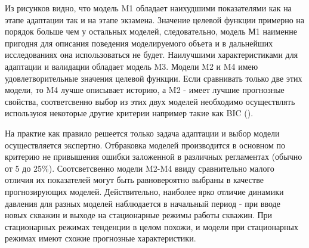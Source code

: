\documentclass{article}
\begin{document}
Из рисунков видно, что модель M1 обладает наихудшими показателями как на этапе адаптации так и на этапе экзамена. Значение целевой функции примерно на порядок больше чем у остальных моделей, следовательно, модель М1 наименне пригодня для описания поведения моделируемого объета и в дальнейших исследованиях она использоваться не будет. Наилучшими характеристиками для адаптации и валидации обладает модель M3. Модели M2 и M4 имею удовлетворительные значения целевой функции. Если сравнивать только две этих модели, то M4 лучше описывает историю, а M2 - имеет лучшие прогнозные свойства, соответсвенно выбор из этих двух моделей необходимо осуществлять используюя некоторые другие критерии например такие как BIC (\cite{mus}).

На практие как правило решеется только задача адаптации и выбор модели осуществляется экспертно. Отбраковка моделей производится в основном по критерию не привышения ошибки заложенной в различных регламентах (обычно от 5 до 25\%). Соотсветсвенно модели M2-M4 ввиду сравнительно малого отличия их показателей могут быть равновероятно выбраны в качестве прогнозирующих моделей. Действительно, наиболее ярко отличие динамики давления для разных моделей наблюдается в начальный период - при вводе новых скважин и выходе на стационарные режимы работы скважин. При стационарных режимах тенденции в целом похожи, и модели при стационарных режимах имеют схожие прогнозные характеристики. 
\end{document}
